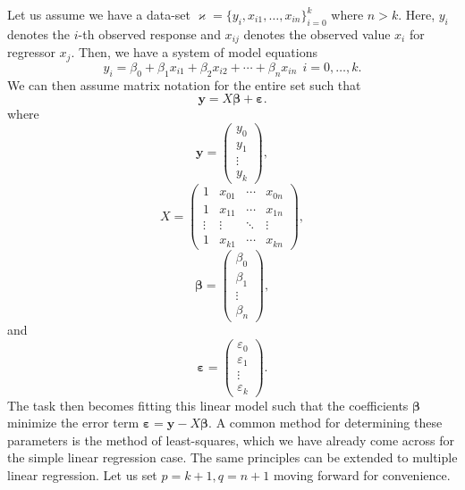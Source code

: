 \documentclass[10pt,a4paper, onecolumn, conference]{IEEEtran}
\theoremstyle{own}
\theoremstyle{definition}
\theoremstyle{plain}
\begin{document}
Let us assume we have a data-set $\varkappa = \{y_i, x_{i1}, \ldots, x_{in} \}_{i=0}^k$ where $n > k$. Here, $y_i$ denotes the $i$-th observed response and $x_{ij}$ denotes the observed value $x_i$ for regressor $x_j$. Then, we have a system of model equations
\begin{equation}
y_i = \beta_0 + \beta_1 x_{i1} + \beta_2 x_{i2} + \cdots + \beta_n x_{in} ~~ i = 0, \ldots, k.
\end{equation}
We can then assume matrix notation for the entire set such that
\begin{equation}
\mathbf{y} = X \boldsymbol\beta + \boldsymbol\varepsilon.
\end{equation}
where
\begin{equation}
\mathbf{y} = \left( \begin{matrix} y_0 \\ y_1 \\ \vdots \\ y_k \end{matrix} \right),
\end{equation}
\begin{equation}
X = \left( \begin{matrix}
1 & x_{01} & \cdots & x_{0n} \\
1 & x_{11} & \cdots & x_{1n} \\
\vdots & \vdots & \ddots & \vdots \\
1 & x_{k1} & \cdots & x_{kn} 
\end{matrix} \right),
\end{equation}
\begin{equation}
\boldsymbol\beta = \left( \begin{matrix} \beta_0 \\ \beta_1 \\ \vdots \\ \beta_n \end{matrix} \right),
\end{equation}
and
\begin{equation}
\boldsymbol\varepsilon = \left( \begin{matrix} \varepsilon_0 \\ \varepsilon_1 \\ \vdots \\ \varepsilon_k \end{matrix} \right).
\end{equation}
The task then becomes fitting this linear model such that the coefficients $\boldsymbol\beta$ minimize the error term $\boldsymbol\varepsilon = \mathbf{y} - X \boldsymbol\beta$. A common method for determining these parameters is the method of least-squares, which we have already come across for the simple linear regression case. The same principles can be extended to multiple linear regression. Let us set $p = k+1, q = n+1$ moving forward for convenience.
\end{document}
